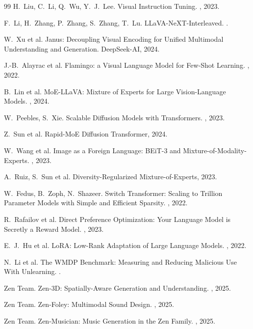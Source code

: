\documentclass[11pt,a4paper]{article}
\begin{document}
\begin{thebibliography}{99}
H.~Liu, C.~Li, Q.~Wu, Y.~J.~Lee.
\newblock Visual Instruction Tuning.
, 2023.

F.~Li, H.~Zhang, P.~Zhang, S.~Zhang, T.~Lu.
\newblock LLaVA-NeXT-Interleaved.
.

W.~Xu et al.
\newblock Janus: Decoupling Visual Encoding for Unified Multimodal Understanding and Generation.
\newblock DeepSeek-AI, 2024.

J.-B.~Alayrac et al.
\newblock Flamingo: a Visual Language Model for Few-Shot Learning.
, 2022.

B.~Lin et al.
\newblock MoE-LLaVA: Mixture of Experts for Large Vision-Language Models.
, 2024.

W.~Peebles, S.~Xie.
\newblock Scalable Diffusion Models with Transformers.
, 2023.

Z.~Sun et al.
\newblock Rapid-MoE Diffusion Transformer, 2024.

W.~Wang et al.
\newblock Image as a Foreign Language: BEiT-3 and Mixture-of-Modality-Experts.
, 2023.

A.~Ruiz, S.~Sun et al.
\newblock Diversity-Regularized Mixture-of-Experts, 2023.

W.~Fedus, B.~Zoph, N.~Shazeer.
\newblock Switch Transformer: Scaling to Trillion Parameter Models with Simple and Efficient Sparsity.
, 2022.

R.~Rafailov et al.
\newblock Direct Preference Optimization: Your Language Model is Secretly a Reward Model.
, 2023.

E.~J.~Hu et al.
\newblock LoRA: Low-Rank Adaptation of Large Language Models.
, 2022.

N.~Li et al.
\newblock The WMDP Benchmark: Measuring and Reducing Malicious Use With Unlearning.
.

Zen Team.
\newblock Zen-3D: Spatially-Aware Generation and Understanding.
, 2025.

Zen Team.
\newblock Zen-Foley: Multimodal Sound Design.
, 2025.

Zen Team.
\newblock Zen-Musician: Music Generation in the Zen Family.
, 2025.


\end{thebibliography}
\end{document}
